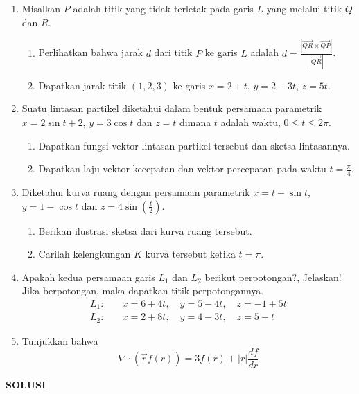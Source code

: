 \documentclass[11pt,letterpaper]{article}
\begin{document}
\begin{enumerate}
  \item Misalkan $P$ adalah titik yang tidak terletak pada garis $L$ yang melalui titik $Q$ dan $R$.
        \begin{enumerate}[label=\alph*.]
          \item Perlihatkan bahwa jarak $d$ dari titik $P$ ke garis $L$ adalah $d = \frac{|\vec{QR} \times \vec{QP}|}{|\vec{QR}|}$.
          \item Dapatkan jarak titik $(1, 2, 3)$ ke garis $x = 2 + t$, $y = 2 - 3t$, $z = 5t$.
        \end{enumerate}
  \item Suatu lintasan partikel diketahui dalam bentuk persamaan parametrik $x = 2\sin t + 2$, $y = 3\cos t$ dan $z = t$ dimana $t$ adalah waktu, $0 \leq t \leq 2\pi$.
        \begin{enumerate}[label=\alph*.]
          \item Dapatkan fungsi vektor lintasan partikel tersebut dan sketsa lintasannya.
          \item Dapatkan laju vektor kecepatan dan vektor percepatan pada waktu $t = \frac{\pi}{4}$.
        \end{enumerate}
  \item Diketahui kurva ruang dengan persamaan parametrik $x = t - \sin t$, $y = 1 - \cos t$ dan $z = 4\sin\left(\frac{t}{2}\right)$.
        \begin{enumerate}[label=\alph*.]
          \item Berikan ilustrasi sketsa dari kurva ruang tersebut.
          \item Carilah kelengkungan $K$ kurva tersebut ketika $t = \pi$.
        \end{enumerate}
  \item Apakah kedua persamaan garis $L_1$ dan $L_2$ berikut perpotongan?, Jelaskan! Jika berpotongan, maka dapatkan titik perpotongannya.
        \begin{align*}
          L_1: & \quad x = 6 + 4t, \quad y = 5 - 4t, \quad z = -1 + 5t \\
          L_2: & \quad x = 2 + 8t, \quad y = 4 - 3t, \quad z = 5 - t
        \end{align*}
  \item Tunjukkan bahwa
        \[ \nabla \cdot (\vec{r} f(r)) = 3f(r) + |r|\frac{df}{dr} \]
\end{enumerate}

\newpage
\begin{center}
  \textbf{SOLUSI}
\end{center}
\end{document}
